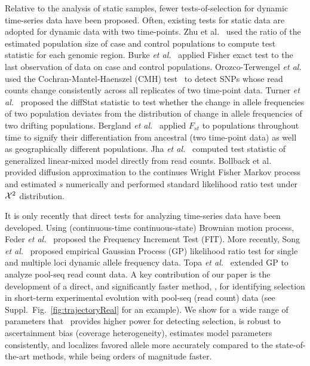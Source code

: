 Relative to the analysis of static samples, fewer tests-of-selection
for dynamic time-series data have been proposed. Often, existing tests
for static data are adopted for dynamic data with two time-points. Zhu
et al.~\cite{zhou2011experimental} used the ratio of the estimated
population size of case and control populations to compute test
statistic for each genomic region. Burke \emph{et
 al.}~\cite{burke2010genome} applied Fisher exact test to the last
observation of data on case and control populations. Orozco-Terwengel
\emph{et al.}~\cite{orozco2012adaptation} used the
Cochran-Mantel-Haenszel (CMH) test~\cite{agresti2011categorical} to
detect SNPs whose read counts change consistently across all
replicates of two time-point data. Turner \emph{et
 al.}~\cite{turner2011population} proposed the diffStat statistic to
test whether the change in allele frequencies of two population
deviates from the distribution of change in allele frequencies of two
drifting populations. Bergland \emph{et
 al.}~\cite{bergland2014genomic} applied $F_{st}$ to populations
throughout time to signify their differentiation from ancestral (two
time-point data) as well as geographically different populations. Jha
\emph{et al.}~\cite{jha2015whole} computed test statistic of
generalized linear-mixed model directly from read counts. Bollback et
al.~\cite{bollback2008estimation} provided diffusion approximation to
the continues Wright Fisher Markov process and estimated $s$
numerically and performed standard likelihood ratio test under ${\cal X}^2$
distribution.

It is only recently that direct tests for analyzing time-series data
have been developed. Using (continuous-time continuous-state) Brownian
motion process, Feder \emph{et al.}~\cite{feder2014Identifying}
proposed the Frequency Increment Test (FIT). More recently, Song \emph{et
 al.}~\cite{Terhorst2015Multi} proposed empirical Gaussian Process
(GP) likelihood ratio test for single and multiple loci dynamic allele
frequency data. Topa \emph{et al.}~\cite{topa2015gaussian} extended GP to 
analyze pool-seq read count data. A key contribution of our paper is
the development of a direct, and significantly faster method, \comale,
for identifying selection in short-term experimental evolution with
pool-seq (read count) data (see
Suppl.~Fig.~\ref{fig:trajectoryReal} for an example). We show for a
wide range of parameters that \comale\ provides higher power for
detecting selection, is robust to ascertainment bias (coverage heterogeneity), 
estimates model
parameters consistently, and localizes favored allele more
accurately compared to the state-of-the-art methods, while being
orders of magnitude faster.
